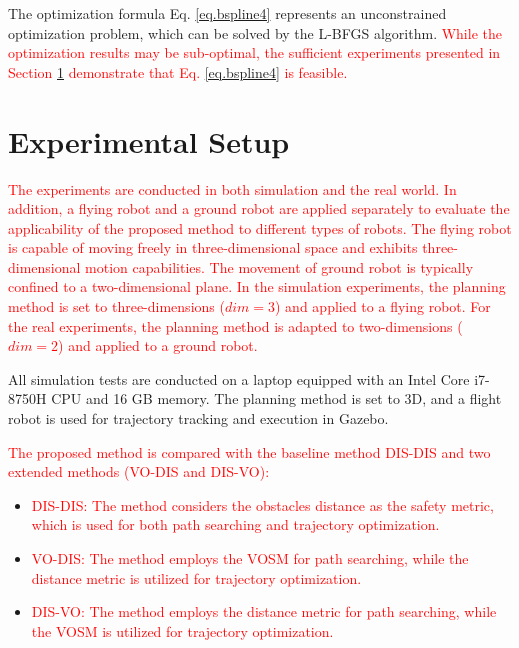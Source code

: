 \documentclass[preprint,5p,times,twocolumn,authoryear]{elsarticle}
\begin{document}
The optimization formula Eq. \ref{eq.bspline4} represents an unconstrained optimization problem, which can be solved by the L-BFGS \citep{liu1989limited} algorithm. \textcolor{red}{While the optimization results may be sub-optimal, the sufficient experiments presented in Section \ref{Experiments} demonstrate that Eq. \ref{eq.bspline4} is feasible.}

\section{Experimental Setup}
\label{Experiments}

\textcolor{red}{
The experiments are conducted in both simulation and the real world. In addition, a flying robot and a ground robot are applied separately to evaluate the applicability of the proposed method to different types of robots. The flying robot is capable of moving freely in three-dimensional space and exhibits three-dimensional motion capabilities. The movement of ground robot is typically confined to a two-dimensional plane. In the simulation experiments, the planning method is set to three-dimensions ($dim = 3$) and applied to a flying robot. For the real experiments, the planning method is adapted to two-dimensions ($dim = 2$) and applied to a ground robot.
}

All simulation tests are conducted on a laptop equipped with an Intel Core i7-8750H CPU and 16 GB memory. The planning method is set to 3D, and a flight robot is used for trajectory tracking and execution in Gazebo.

\textcolor{red}{
The proposed method is compared with the baseline method DIS-DIS\citep{wang2021autonomous} and two extended methods (VO-DIS and DIS-VO):}

\begin{itemize}
\item \textcolor{red}{
DIS-DIS\citep{wang2021autonomous}: The method considers the obstacles distance as the safety metric, which is used for both path searching and trajectory optimization.}

\item \textcolor{red}{
VO-DIS: The method employs the VOSM for path searching, while the distance metric is utilized for trajectory optimization.}

\item \textcolor{red}{
DIS-VO: The method employs the distance metric for path searching, while the VOSM is utilized for trajectory optimization.}

\end{itemize}
\end{document}
